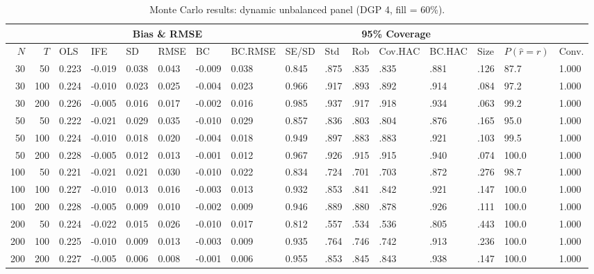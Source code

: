 \begin{table}[ht]
\centering
\caption{Monte Carlo results: dynamic unbalanced panel (DGP 4, fill = 60\%).} 
\label{tab:mc_dyn_unb_f60}
\begin{tabular}{rrllllllllllllll}
  \hline
 & & \multicolumn{6}{c}{Bias \& RMSE} & & \multicolumn{4}{c}{95\% Coverage} & & & \\
\cline{3-8}\cline{10-13}
 \hline
$N$ & $T$ & OLS & IFE & SD & RMSE & BC & BC.RMSE & SE/SD & Std & Rob & Cov.HAC & BC.HAC & Size & $P(\hat r=r)$ & Conv. \\ 
  \hline
30 & 50 & 0.223 & -0.019 & 0.038 & 0.043 & -0.009 & 0.038 & 0.845 & .875 & .835 & .835 & .881 & .126 & 87.7 & 1.000 \\ 
  30 & 100 & 0.224 & -0.010 & 0.023 & 0.025 & -0.004 & 0.023 & 0.966 & .917 & .893 & .892 & .914 & .084 & 97.2 & 1.000 \\ 
  30 & 200 & 0.226 & -0.005 & 0.016 & 0.017 & -0.002 & 0.016 & 0.985 & .937 & .917 & .918 & .934 & .063 & 99.2 & 1.000 \\ 
  50 & 50 & 0.222 & -0.021 & 0.029 & 0.035 & -0.010 & 0.029 & 0.857 & .836 & .803 & .804 & .876 & .165 & 95.0 & 1.000 \\ 
  50 & 100 & 0.224 & -0.010 & 0.018 & 0.020 & -0.004 & 0.018 & 0.949 & .897 & .883 & .883 & .921 & .103 & 99.5 & 1.000 \\ 
  50 & 200 & 0.228 & -0.005 & 0.012 & 0.013 & -0.001 & 0.012 & 0.967 & .926 & .915 & .915 & .940 & .074 & 100.0 & 1.000 \\ 
  100 & 50 & 0.221 & -0.021 & 0.021 & 0.030 & -0.010 & 0.022 & 0.834 & .724 & .701 & .703 & .872 & .276 & 98.7 & 1.000 \\ 
  100 & 100 & 0.227 & -0.010 & 0.013 & 0.016 & -0.003 & 0.013 & 0.932 & .853 & .841 & .842 & .921 & .147 & 100.0 & 1.000 \\ 
  100 & 200 & 0.228 & -0.005 & 0.009 & 0.010 & -0.002 & 0.009 & 0.946 & .889 & .880 & .878 & .926 & .111 & 100.0 & 1.000 \\ 
  200 & 50 & 0.224 & -0.022 & 0.015 & 0.026 & -0.010 & 0.017 & 0.812 & .557 & .534 & .536 & .805 & .443 & 100.0 & 1.000 \\ 
  200 & 100 & 0.225 & -0.010 & 0.009 & 0.013 & -0.003 & 0.009 & 0.935 & .764 & .746 & .742 & .913 & .236 & 100.0 & 1.000 \\ 
  200 & 200 & 0.227 & -0.005 & 0.006 & 0.008 & -0.001 & 0.006 & 0.955 & .853 & .845 & .843 & .938 & .147 & 100.0 & 1.000 \\ 
   \hline
\end{tabular}
\end{table}
